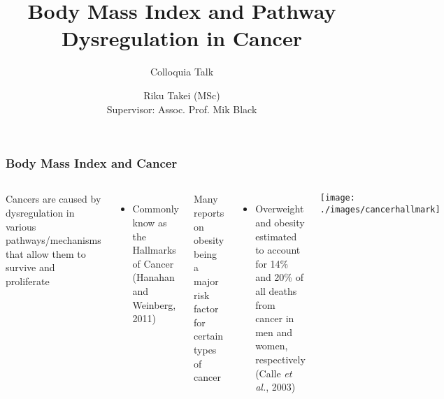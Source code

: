 \documentclass[handout]{beamer}
\title[BMI and Cancer]{Body Mass Index and Pathway Dysregulation in Cancer}
\subtitle{Colloquia Talk}
\author[Riku Takei]{Riku Takei (MSc)\\Supervisor: Assoc. Prof. Mik Black}
\institute{Department of Biochemistry, University of Otago}
\begin{document}
{
	\begin{frame}[noframenumbering]
		\titlepage
	\end{frame}
}



\begin{frame}
	\frametitle{Body Mass Index and Cancer}
	\begin{columns}
		{\footnotesize
			Cancers are caused by dysregulation in various pathways/mechanisms that allow them to survive and proliferate
			\begin{itemize}
				\item Commonly know as the Hallmarks of Cancer {\tiny(Hanahan and Weinberg, 2011)}
			\end{itemize}
			Many reports on obesity being a major risk factor for certain types of cancer
			\begin{itemize}
				\item Overweight and obesity estimated to account for 14\% and 20\% of all deaths from cancer in men and women, respectively {\tiny(Calle \textit{et al.}, 2003)}
			\end{itemize}
		}
		\texttt{[image: ./images/cancerhallmark]}
	\end{columns}
\end{frame}
\end{document}
